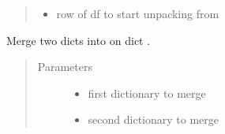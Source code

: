 \documentclass[letterpaper,10pt,english]{sphinxmanual}
\begin{document}
\begin{fulllineitems}
\begin{fulllineitems}
\begin{quote}
\begin{description}
\begin{itemize}
\item {} 
\sphinxAtStartPar
{} \textendash{} row of df to start unpacking from

\end{itemize}

\end{description}\end{quote}

\end{fulllineitems}


\begin{fulllineitems}
\label{\detokenize{autoapi/Input/index:Input.Input.add_dicts}}
\sphinxAtStartPar
Merge two dicts into on dict .
\begin{quote}\begin{description}
\item[{Parameters}] \leavevmode\begin{itemize}
\item {} 
\sphinxAtStartPar
{} \textendash{} first dictionary to merge

\item {} 
\sphinxAtStartPar
{} \textendash{} second dictionary to merge

\end{itemize}

\end{description}\end{quote}

\end{fulllineitems}


\end{fulllineitems}



\section{}
\label{\detokenize{autoapi/Integrator/index:module-Integrator}}\label{\detokenize{autoapi/Integrator/index:integrator}}\label{\detokenize{autoapi/Integrator/index::doc}}
\end{document}
